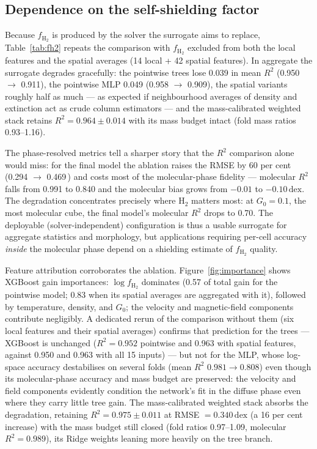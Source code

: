\documentclass[fleqn,usenatbib]{rasti}
\newcommand{\Gzero}{G_0}
\newcommand{\fshield}{f_{\mathrm{H_2}}}
\newcommand{\dex}{\,\text{dex}}
\newcommand{\Rsq}{R^2}
\begin{document}
\subsection{Dependence on the self-shielding factor}
\label{sec:ablation_fh2}

Because \(\fshield\) is produced by the solver the surrogate aims to
replace, Table~\ref{tab:fh2} repeats the comparison with \(\fshield\)
excluded from both the local features and the spatial averages (14
local + 42 spatial features). In aggregate the surrogate degrades
gracefully: the pointwise trees lose 0.039 in mean \(\Rsq\)
(0.950 \(\rightarrow\) 0.911), the pointwise MLP 0.049
(0.958 \(\rightarrow\) 0.909), the spatial variants roughly half as much
--- as expected if neighbourhood averages of density and extinction act
as crude column estimators --- and the mass-calibrated weighted stack
retains \(\Rsq = 0.964 \pm 0.014\) with its mass budget intact
(fold mass ratios 0.93--1.16).

The phase-resolved metrics tell a sharper story that the \(\Rsq\)
comparison alone would miss: for the final model the ablation raises the
RMSE by 60 per cent (0.294 \(\rightarrow\) 0.469\dex) and costs most of
the molecular-phase fidelity --- molecular \(\Rsq\) falls from 0.991 to
0.840 and the molecular bias grows from \(-0.01\) to \(-0.10\dex\). The
degradation concentrates precisely where H\(_2\) matters most: at
\(\Gzero = 0.1\), the most molecular cube, the final model's molecular
\(\Rsq\) drops to 0.70. The deployable (solver-independent) configuration
is thus a usable surrogate for aggregate statistics and morphology, but
applications requiring per-cell accuracy \emph{inside} the molecular
phase depend on a shielding estimate of \(\fshield\) quality.

Feature attribution corroborates the ablation.
Figure~\ref{fig:importance} shows XGBoost gain importances:
\(\log\fshield\) dominates (0.57 of total gain for the pointwise model;
0.83 when its spatial averages are aggregated with it), followed by
temperature, density, and \(\Gzero\); the velocity and magnetic-field
components contribute negligibly. A dedicated rerun of the comparison
without them (six local features and their spatial averages) confirms
that prediction for the trees --- XGBoost is unchanged
(\(\Rsq = 0.952\) pointwise and 0.963 with spatial features, against
0.950 and 0.963 with all 15 inputs) --- but not for the MLP, whose
log-space accuracy destabilises on several folds (mean \(\Rsq\)
\(0.981 \rightarrow 0.808\)) even though its molecular-phase accuracy
and mass budget are preserved: the velocity and field components
evidently condition the network's fit in the diffuse phase even where
they carry little tree gain. The mass-calibrated weighted stack absorbs
the degradation, retaining \(\Rsq = 0.975 \pm 0.011\) at
RMSE \(= 0.340\dex\) (a 16 per cent increase) with the mass budget
still closed (fold ratios 0.97--1.09, molecular \(\Rsq = 0.989\)), its
Ridge weights leaning more heavily on the tree branch.
\end{document}
